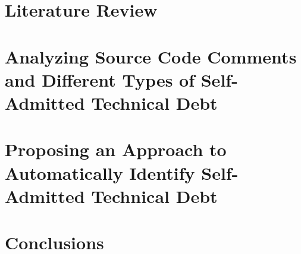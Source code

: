\documentclass[12pt]{report}
\begin{document}
\chapter{Literature Review}
\label{literature_review}


\chapter{Analyzing Source Code Comments and Different Types of Self-Admitted Technical Debt}
\label{chapter3}


\chapter{Proposing an Approach to Automatically Identify Self-Admitted Technical Debt}
\label{chapter4}


\chapter{Conclusions}
\label{conclusion}



  

\end{document}
